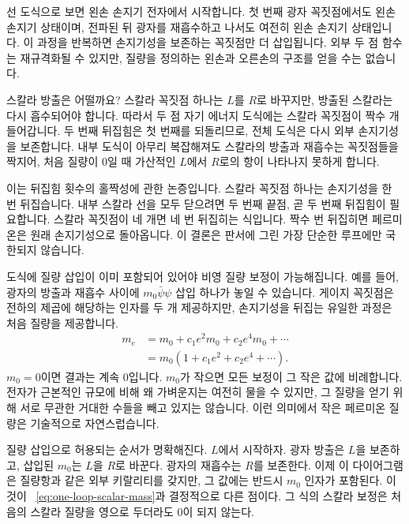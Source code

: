 선 도식으로 보면 왼손 손지기 전자에서 시작합니다. 첫 번째 광자 꼭짓점에서도 왼손 손지기 상태이며, 전파된 뒤 광자를 재흡수하고 나서도 여전히 왼손 손지기 상태입니다. 이 과정을 반복하면 손지기성을 보존하는 꼭짓점만 더 삽입됩니다. 외부 두 점 함수는 재규격화될 수 있지만, 질량을 정의하는 왼손과 오른손의 구조를 얻을 수는 없습니다.

스칼라 방출은 어떨까요? 스칼라 꼭짓점 하나는 \(L\)를 \(R\)로 바꾸지만, 방출된 스칼라는 다시 흡수되어야 합니다. 따라서 두 점 자기 에너지 도식에는 스칼라 꼭짓점이 짝수 개 들어갑니다. 두 번째 뒤집힘은 첫 번째를 되돌리므로, 전체 도식은 다시 외부 손지기성을 보존합니다. 내부 도식이 아무리 복잡해져도 스칼라의 방출과 재흡수는 꼭짓점들을 짝지어, 처음 질량이 0일 때 가산적인 \(L\)에서 \(R\)로의 항이 나타나지 못하게 합니다.

이는 뒤집힘 횟수의 홀짝성에 관한 논증입니다. 스칼라 꼭짓점 하나는 손지기성을 한 번 뒤집습니다. 내부 스칼라 선을 모두 닫으려면 두 번째 끝점, 곧 두 번째 뒤집힘이 필요합니다. 스칼라 꼭짓점이 네 개면 네 번 뒤집히는 식입니다. 짝수 번 뒤집히면 페르미온은 원래 손지기성으로 돌아옵니다. 이 결론은 판서에 그린 가장 단순한 루프에만 국한되지 않습니다.

도식에 질량 삽입이 이미 포함되어 있어야 비영 질량 보정이 가능해집니다. 예를 들어, 광자의 방출과 재흡수 사이에 \(m_0\bar\psi\psi\) 삽입 하나가 놓일 수 있습니다. 게이지 꼭짓점은 전하의 제곱에 해당하는 인자를 두 개 제공하지만, 손지기성을 뒤집는 유일한 과정은 처음 질량을 제공합니다.
\begin{equation}
\begin{aligned}
m_e
&=m_0+c_1e^2m_0+c_2e^4m_0+\cdots\\
&=m_0\left(1+c_1e^2+c_2e^4+\cdots\right).
\end{aligned}
\label{eq:multiplicative-fermion-mass}
\end{equation}
\(m_0=0\)이면 결과는 계속 0입니다. \(m_0\)가 작으면 모든 보정이 그 작은 값에 비례합니다. 전자가 근본적인 규모에 비해 왜 가벼운지는 여전히 물을 수 있지만, 그 질량을 얻기 위해 서로 무관한 거대한 수들을 빼고 있지는 않습니다. 이런 의미에서 작은 페르미온 질량은 기술적으로 자연스럽습니다.

질량 삽입으로 허용되는 순서가 명확해진다. \(L\)에서 시작하자. 광자 방출은 \(L\)을 보존하고, 삽입된 \(m_0\)는 \(L\)을 \(R\)로 바꾼다. 광자의 재흡수는 \(R\)를 보존한다. 이제 이 다이어그램은 질량항과 같은 외부 키랄리티를 갖지만, 그 값에는 반드시 \(m_0\) 인자가 포함된다. 이것이 ~\eqref{eq:one-loop-scalar-mass}과 결정적으로 다른 점이다. 그 식의 스칼라 보정은 처음의 스칼라 질량을 영으로 두더라도 0이 되지 않는다.

